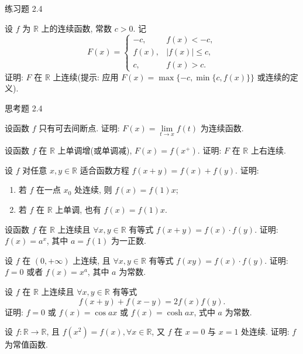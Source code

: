 \begin{exblock}{练习题 2.4}
\item 设 $f$ 为 $\mathbb{R}$ 上的连续函数, 常数 $c > 0$. 记
  \[
  F(x) = \begin{cases} -c, & f(x) < -c, \\ f(x), & |f(x)| \leqslant c, \\ c, & f(x) > c. \end{cases}
\]
  证明: $F$ 在 $\mathbb{R}$ 上连续(提示: 应用 $F(x) = \max\{-c, \min\{c, f(x)\}\}$ 或连续的定义).
\end{exblock}

\begin{exblock}{思考题 2.4}
\item 设函数 $f$ 只有可去间断点. 证明: $F(x) = \lim\limits_{t \to x} f(t)$ 为连续函数.

\item 设函数 $f$ 在 $\mathbb{R}$ 上单调增(或单调减), $F(x) = f(x^+)$. 证明: $F$ 在 $\mathbb{R}$ 上右连续.

\item 设 $f$ 对任意 $x, y \in \mathbb{R}$ 适合函数方程 $f(x + y) = f(x) + f(y)$. 证明:
  \begin{enumerate}[label=(\arabic*)]
    \item 若 $f$ 在一点 $x_0$ 处连续, 则 $f(x) = f(1)x$;
    \item 若 $f$ 在 $\mathbb{R}$ 上单调, 也有 $f(x) = f(1)x$.
  \end{enumerate}

\item 设函数 $f$ 在 $\mathbb{R}$ 上连续且 $\forall x, y \in \mathbb{R}$ 有等式 $f(x + y) = f(x) \cdot f(y)$. 证明: $f(x) = a^x$, 其中 $a = f(1)$ 为一正数.

\item 设 $f$ 在 $(0, +\infty)$ 上连续, 且 $\forall x, y \in \mathbb{R}$ 有等式 $f(xy) = f(x) \cdot f(y)$. 证明: $f = 0$ 或者 $f(x) = x^a$, 其中 $a$ 为常数.

\item 设 $f$ 在 $\mathbb{R}$ 上连续且 $\forall x, y \in \mathbb{R}$ 有等式
  \[
  f(x + y) + f(x - y) = 2f(x)f(y).
\]
  证明: $f = 0$ 或 $f(x) = \cos ax$ 或 $f(x) = \cosh ax$, 式中 $a$ 为常数.

\item 设 $f: \mathbb{R} \to \mathbb{R}$, 且 $f(x^2) = f(x), \forall x \in \mathbb{R}$, 又 $f$ 在 $x = 0$ 与 $x = 1$ 处连续. 证明: $f$ 为常值函数.
\end{exblock}
